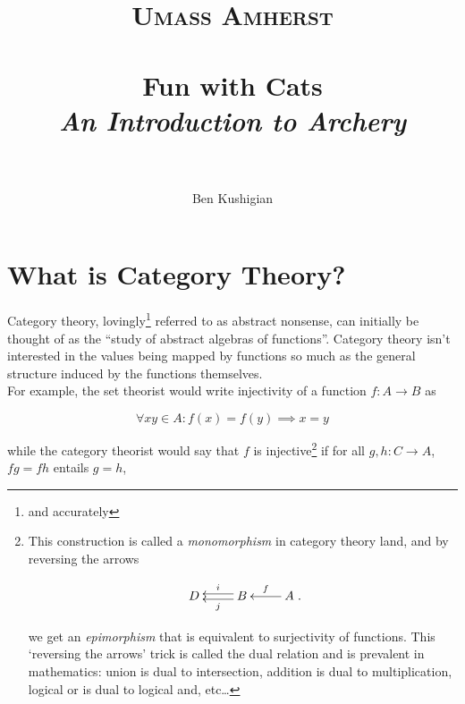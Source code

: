 %
%
%
%



\title{%
\normalfont\normalsize 
\textsc{Umass Amherst} \\ [25pt] %
\horrule{0.5pt} \\[0.4cm] %
\huge Fun with Cats \\[0.2cm] %
\large\textit{An Introduction to Archery}\\
\horrule{2pt} \\%
}
\author{Ben Kushigian} %
\date{} %

\maketitle %

\section*{What is Category Theory?}
Category theory, lovingly\footnote{and accurately} referred to as abstract
nonsense, can initially be thought of as the ``study of abstract algebras of
functions''. Category theory isn't interested in the values being mapped by
functions so much as the general structure induced by the functions
themselves.\\ 

For example, the set theorist would write injectivity of a function \(f: A \to
B\) as

\[\forall xy \in A: f(x) = f(y) \implies x = y\]

while the category theorist would say that \(f\) is injective\footnote{This
construction is called a \textit{monomorphism} in category theory land, and by
reversing the arrows 

\[\xymatrix{  D & B\ar@<.5ex>[l]^j\ar@<-.5ex>[l]_i  & A\ar[l]_f }.\]

we get an \textit{epimorphism} that is equivalent to surjectivity of functions.
This `reversing the arrows' trick is called the dual relation and is prevalent
in mathematics: union is dual to intersection, addition is dual to
multiplication, logical or is dual to logical and, etc\ldots}
if for all \(g,h : C \to A\), \(fg = fh\) entails \(g = h\),

